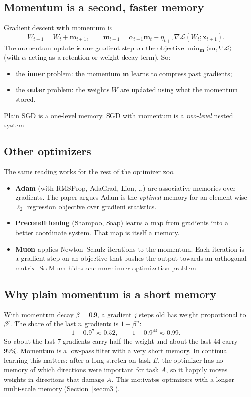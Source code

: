 \documentclass[11pt,a4paper]{article}
\newcommand{\Lc}{\mathcal{L}}
\newcommand{\bx}{\mathbf{x}}
\newcommand{\bm}{\mathbf{m}}
\newcommand{\inner}[2]{\langle #1, #2\rangle}
\begin{document}
\subsection{Momentum is a second, faster memory}
Gradient descent with momentum is
\begin{equation}
  W_{t+1} = W_t + \bm_{t+1},\qquad \bm_{t+1} = \alpha_{t+1}\bm_t - \eta_{t+1}\nabla\Lc(W_t;\bx_{t+1}).
\end{equation}
The momentum update is one gradient step on the objective $\min_{\bm}\inner{\bm}{\nabla\Lc}$ (with $\alpha$ acting as a retention or weight-decay term). So:
\begin{itemize}
  \item the \textbf{inner} problem: the momentum $\bm$ learns to compress past gradients;
  \item the \textbf{outer} problem: the weights $W$ are updated using what the momentum stored.
\end{itemize}
Plain SGD is a one-level memory. SGD with momentum is a \emph{two-level} nested system.

\subsection{Other optimizers}
The same reading works for the rest of the optimizer zoo.
\begin{itemize}
  \item \textbf{Adam} (with RMSProp, AdaGrad, Lion, \dots) are associative memories over gradients. The paper argues Adam is the \emph{optimal} memory for an element-wise $\ell_2$ regression objective over gradient statistics.
  \item \textbf{Preconditioning} (Shampoo, Soap) learns a map from gradients into a better coordinate system. That map is itself a memory.
  \item \textbf{Muon} applies Newton--Schulz iterations to the momentum. Each iteration is a gradient step on an objective that pushes the output towards an orthogonal matrix. So Muon hides one more inner optimization problem.
\end{itemize}

\subsection{Why plain momentum is a short memory}
With momentum decay $\beta=0.9$, a gradient $j$ steps old has weight proportional to $\beta^{j}$. The share of the last $n$ gradients is $1-\beta^{n}$:
\[
 1-0.9^{7}\approx 0.52,\qquad 1-0.9^{44}\approx 0.99 .
\]
So about the last 7 gradients carry half the weight and about the last 44 carry 99\%. Momentum is a low-pass filter with a very short memory. In continual learning this matters: after a long stretch on task $B$, the optimizer has no memory of which directions were important for task $A$, so it happily moves weights in directions that damage $A$. This motivates optimizers with a longer, multi-scale memory (Section~\ref{sec:m3}).
\end{document}
